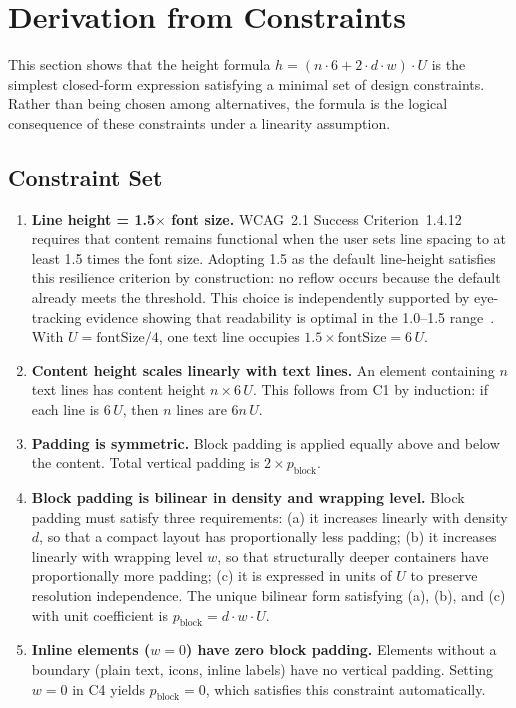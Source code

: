 \section{Derivation from Constraints}
\label{sec:derivation}

This section shows that the height formula $h = (n \cdot 6 + 2 \cdot d \cdot w) \cdot U$ is the simplest closed-form expression satisfying a minimal set of design constraints. Rather than being chosen among alternatives, the formula is the logical consequence of these constraints under a linearity assumption.

\subsection{Constraint Set}

\begin{enumerate}
  \item[\textbf{C1.}] \textbf{Line height = 1.5$\times$ font size.}
  WCAG~2.1 Success Criterion~1.4.12~\cite{wcag21text} requires that content remains functional when the user sets line spacing to at least 1.5 times the font size. Adopting 1.5 as the default line-height satisfies this resilience criterion by construction: no reflow occurs because the default already meets the threshold. This choice is independently supported by eye-tracking evidence showing that readability is optimal in the 1.0--1.5 range~\cite{rello2016}. With $U = \text{fontSize}/4$, one text line occupies $1.5 \times \text{fontSize} = 6\,U$.

  \item[\textbf{C2.}] \textbf{Content height scales linearly with text lines.}
  An element containing $n$ text lines has content height $n \times 6\,U$. This follows from C1 by induction: if each line is $6\,U$, then $n$ lines are $6n\,U$.

  \item[\textbf{C3.}] \textbf{Padding is symmetric.}
  Block padding is applied equally above and below the content. Total vertical padding is $2 \times p_{\text{block}}$.

  \item[\textbf{C4.}] \textbf{Block padding is bilinear in density and wrapping level.}
  Block padding must satisfy three requirements: (a) it increases linearly with density $d$, so that a compact layout has proportionally less padding; (b) it increases linearly with wrapping level $w$, so that structurally deeper containers have proportionally more padding; (c) it is expressed in units of $U$ to preserve resolution independence. The unique bilinear form satisfying (a), (b), and (c) with unit coefficient is $p_{\text{block}} = d \cdot w \cdot U$.

  \item[\textbf{C5.}] \textbf{Inline elements ($w = 0$) have zero block padding.}
  Elements without a boundary (plain text, icons, inline labels) have no vertical padding. Setting $w = 0$ in C4 yields $p_{\text{block}} = 0$, which satisfies this constraint automatically.
\end{enumerate}

